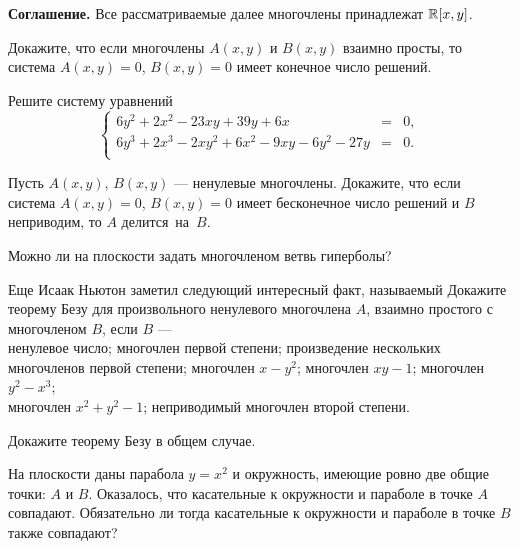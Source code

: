 \documentclass[a4paper,12pt]{article}
\begin{document}
\noindent
{\bf Соглашение.} Все рассматриваемые далее многочлены принадлежат $\mathbb{R}[x,y]$.

 Докажите, что если многочлены $A(x,y)$ и $B(x,y)$ взаимно просты,
то система $A(x,y)=0$, $B(x,y)=0$ имеет конечное число решений.


  Решите систему уравнений
$$
\left\{
\begin{array}{rcl}
6y^2+2x^2-23xy+39y+6x&=&0,\\
6y^3+2x^3-2xy^2+6x^2-9xy-6y^2-27y&=&0.\\
\end{array}
\right.
$$


 Пусть $A(x,y)$, $B(x,y)$ --- ненулевые многочлены.
Докажите, что если система $A(x,y)=0$, $B(x,y)=0$
имеет бесконечное число решений
и %
$B$ неприводим, то $A$ делится~\hbox{на $B$.}


 Можно ли на плоскости задать многочленом ветвь гиперболы?


  Еще Исаак Ньютон заметил следующий интересный факт, называемый
\/
\/
Докажите
теорему Безу  для произвольного ненулевого многочлена $A$,
взаимно простого с многочленом $B$, если $B$ ---\\
 ненулевое число;\quad
{} многочлен первой степени;\quad
{} произведение нескольких многочленов первой степени;\quad
{} многочлен $x-y^2$;\quad
{} многочлен $xy-1$;\quad
{} многочлен $y^2-x^3$;\\
  многочлен $x^2+y^2-1$;\quad
{} неприводимый многочлен второй степени.

 Докажите теорему Безу в общем случае.

На плоскости даны парабола $y=x^2$ и окружность, имеющие ровно две
общие точки: $A$ и $B$. Оказалось, что касательные к окружности и параболе
в точке $A$ совпадают. Обязательно ли тогда касательные
к окружности и параболе в точке $B$ также совпадают?
\end{document}
